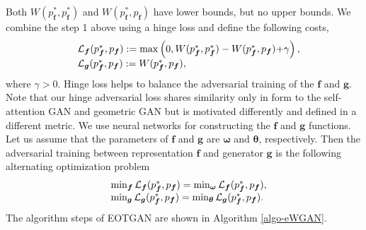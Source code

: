Both $W(p^{\ast}_{\bm{f}}, p^{\ast}_{\bm{f}})$ and $W(p^{\ast}_{\bm{f}}, p_{\bm{f}})$ have lower bounds, but no upper bounds. 
We combine the step 1 above using a hinge loss and define the following costs,
\begin{equation}
  \begin{array}{rl}
    &\mathcal{L}_{\bm{f}}(p^{\ast}_{\bm{f}}, p_{\bm{f}}) := \max\left(0, W(p^{\ast}_{\bm{f}}, p^{\ast}_{\bm{f}})- W(p^{\ast}_{\bm{f}}, p_{\bm{f}}) \hspace{-2pt}+\hspace{-2pt} \gamma \right),\\
    &\mathcal{L}_{\bm{g}}(p^{\ast}_{\bm{f}}, p_{\bm{f}}) := W(p^{\ast}_{\bm{f}}, p_{\bm{f}}),
  \end{array}
\end{equation}
where $\gamma>0$. Hinge loss helps to balance the adversarial training of the $\bm{f}$ and $\bm{g}$.
Note that our hinge adversarial loss shares similarity only in form to the self-attention GAN\cite{2018arXiv180508318Z} and geometric GAN\cite{2017arXiv170502894L} but is motivated differently and defined in a different metric. We use neural networks for constructing the $\bm{f}$ and $\bm{g}$ functions. Let us assume that the parameters of $\bm{f}$ and $\bm{g}$ are $\bm{\omega}$ and $\bm{\theta}$, respectively. Then the adversarial training between representation $\bm{f}$ and
generator $\bm{g}$ is the following alternating optimization problem
\begin{equation}
  \begin{array}{rl}
    &\min_{\bm{f}} \Ll_{\bm{f}}(p^{\ast}_{\bm{f}}, p_{\bm{f}}) = \min_{\bm{\omega}} \Ll_{\bm{f}}(p^{\ast}_{\bm{f}}, p_{\bm{f}}), \\ 
    &\min_{\bm{g}}\Ll_{\bm{g}}(p^{\ast}_{\bm{f}}, p_{\bm{f}}) = \min_{\bm{\th}}\Ll_{\bm{g}}(p^{\ast}_{\bm{f}}, p_{\bm{f}}).
  \end{array}\vspace{-2pt}
\end{equation}
The algorithm steps of EOTGAN are shown in Algorithm \ref{algo-eWGAN}.
